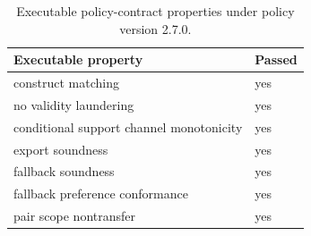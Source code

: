 \begin{table}[t]
  \caption{Executable policy-contract properties under policy version 2.7.0.}
  \label{tab:contract-properties}
  \centering
  \small
  \begin{tabular}{ll}
    \toprule
    Executable property & Passed \\
    \midrule
    construct matching & yes \\
    no validity laundering & yes \\
    conditional support channel monotonicity & yes \\
    export soundness & yes \\
    fallback soundness & yes \\
    fallback preference conformance & yes \\
    pair scope nontransfer & yes \\
    \bottomrule
  \end{tabular}
\end{table}
